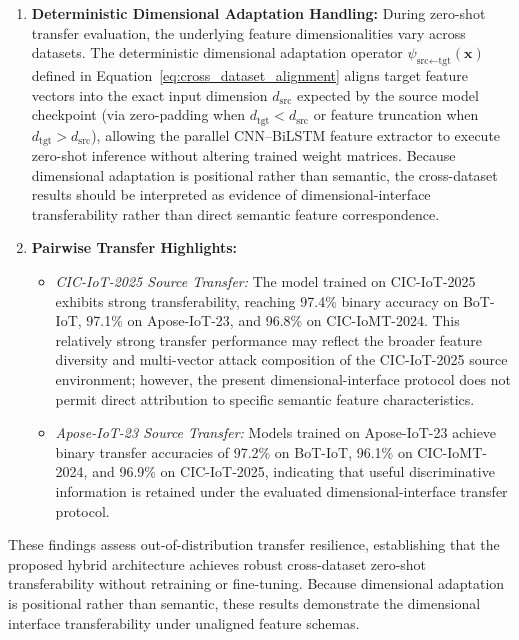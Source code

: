 \documentclass[a4paper,fleqn]{cas-sc}
\begin{document}
\begin{enumerate}
    \item \textbf{Deterministic Dimensional Adaptation Handling:}
    During zero-shot transfer evaluation, the underlying feature dimensionalities vary across datasets. The deterministic dimensional adaptation operator $\psi_{\text{src} \leftarrow \text{tgt}}(\mathbf{x})$ defined in Equation~\ref{eq:cross_dataset_alignment} aligns target feature vectors into the exact input dimension $d_{\text{src}}$ expected by the source model checkpoint (via zero-padding when $d_{\text{tgt}} < d_{\text{src}}$ or feature truncation when $d_{\text{tgt}} > d_{\text{src}}$), allowing the parallel CNN--BiLSTM feature extractor to execute zero-shot inference without altering trained weight matrices. Because dimensional adaptation is positional rather than semantic, the cross-dataset results should be interpreted as evidence of dimensional-interface transferability rather than direct semantic feature correspondence.

    \item \textbf{Pairwise Transfer Highlights:}
    \begin{itemize}
        \item \textit{CIC-IoT-2025 Source Transfer:} The model trained on CIC-IoT-2025 exhibits strong transferability, reaching 97.4\% binary accuracy on BoT-IoT, 97.1\% on Apose-IoT-23, and 96.8\% on CIC-IoMT-2024. This relatively strong transfer performance may reflect the broader feature diversity and multi-vector attack composition of the CIC-IoT-2025 source environment; however, the present dimensional-interface protocol does not permit direct attribution to specific semantic feature characteristics.
        \item \textit{Apose-IoT-23 Source Transfer:} Models trained on Apose-IoT-23 achieve binary transfer accuracies of 97.2\% on BoT-IoT, 96.1\% on CIC-IoMT-2024, and 96.9\% on CIC-IoT-2025, indicating that useful discriminative information is retained under the evaluated dimensional-interface transfer protocol.
    \end{itemize}
\end{enumerate}

These findings assess out-of-distribution transfer resilience, establishing that the proposed hybrid architecture achieves robust cross-dataset zero-shot transferability without retraining or fine-tuning. Because dimensional adaptation is positional rather than semantic, these results demonstrate the dimensional interface transferability under unaligned feature schemas.
\end{document}
